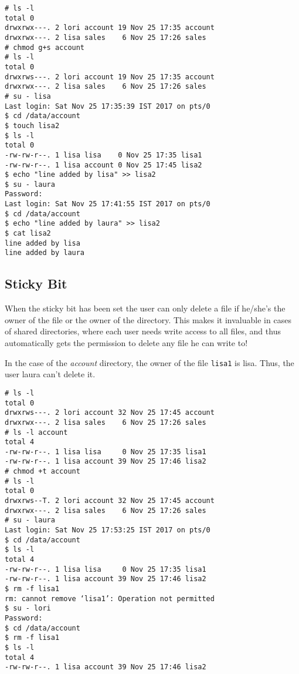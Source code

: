 \vspace{-15pt}
\begin{verbatim}
# ls -l
total 0
drwxrwx---. 2 lori account 19 Nov 25 17:35 account
drwxrwx---. 2 lisa sales    6 Nov 25 17:26 sales
# chmod g+s account
# ls -l
total 0
drwxrws---. 2 lori account 19 Nov 25 17:35 account
drwxrwx---. 2 lisa sales    6 Nov 25 17:26 sales
# su - lisa
Last login: Sat Nov 25 17:35:39 IST 2017 on pts/0
$ cd /data/account
$ touch lisa2
$ ls -l
total 0
-rw-rw-r--. 1 lisa lisa    0 Nov 25 17:35 lisa1
-rw-rw-r--. 1 lisa account 0 Nov 25 17:45 lisa2
$ echo "line added by lisa" >> lisa2
$ su - laura
Password: 
Last login: Sat Nov 25 17:41:55 IST 2017 on pts/0
$ cd /data/account
$ echo "line added by laura" >> lisa2
$ cat lisa2
line added by lisa
line added by laura
\end{verbatim}
\vspace{-10pt}

\subsection{Sticky Bit}
When the sticky bit has been set the user can only delete a file if he/she's the owner of the file or the owner of the directory. This makes it invaluable in cases of shared directories, where each user needs write access to all files, and thus automatically gets the permission to delete any file he can write to! 

In the case of the \textit{account} directory, the owner of the file \verb|lisa1| is lisa. Thus, the user laura can't delete it.

\vspace{-15pt}
\begin{verbatim}
# ls -l
total 0
drwxrws---. 2 lori account 32 Nov 25 17:45 account
drwxrwx---. 2 lisa sales    6 Nov 25 17:26 sales
# ls -l account
total 4
-rw-rw-r--. 1 lisa lisa     0 Nov 25 17:35 lisa1
-rw-rw-r--. 1 lisa account 39 Nov 25 17:46 lisa2
# chmod +t account
# ls -l
total 0
drwxrws--T. 2 lori account 32 Nov 25 17:45 account
drwxrwx---. 2 lisa sales    6 Nov 25 17:26 sales
# su - laura
Last login: Sat Nov 25 17:53:25 IST 2017 on pts/0
$ cd /data/account
$ ls -l
total 4
-rw-rw-r--. 1 lisa lisa     0 Nov 25 17:35 lisa1
-rw-rw-r--. 1 lisa account 39 Nov 25 17:46 lisa2
$ rm -f lisa1
rm: cannot remove ‘lisa1’: Operation not permitted
$ su - lori
Password: 
$ cd /data/account
$ rm -f lisa1
$ ls -l
total 4
-rw-rw-r--. 1 lisa account 39 Nov 25 17:46 lisa2
\end{verbatim}
\vspace{-10pt}

